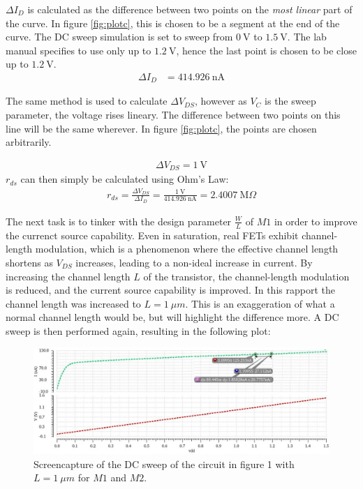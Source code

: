 \documentclass[onecolumn]{article}
\begin{document}
$\Delta I_D$ is calculated as the difference between two points on the \textit{most linear} part of the curve. In figure \ref{fig:plotc}, this is chosen to be a segment at the end of the curve. The DC sweep simulation is set to sweep from $0 \ \text{V}$ to $1.5 \ \text{V}$. The lab manual specifies to use only up to $1.2 \ \text{V}$, hence the last point is chosen to be close up to $1.2 \ \text{V}$.
\begin{align}
    \Delta I_D &= 414.926 \ \text{nA}
\end{align}

The same method is used to calculate $\Delta V_{DS}$, however as $V_C$ is the sweep parameter, the voltage rises lineary. The difference between two points on this line will be the same wherever. In figure \ref{fig:plotc}, the points are chosen arbitrarily.

\begin{align}
    \Delta V_{DS} = 1 \ \text{V}
\end{align}
$r_{ds}$ can then simply be calculated using Ohm's Law:
\begin{align}
    r_{ds} = \frac{\Delta V_{DS}}{\Delta  I_D} = \frac{ 1 \ \text{V}}{414.926 \ \text{nA}} = 2.4007 \ \text{M}\Omega
\end{align}

The next task is to tinker with the design parameter $\frac{W}{L}$ of $M1$ in order to improve the currenct source capability. Even in saturation, real FETs exhibit channel-length modulation, which is a phenomenon where the effective channel length shortens as $V_{DS}$ increases, leading to a non-ideal increase in current. By increasing the channel length $L$ of the transistor, the channel-length modulation is reduced, and the current source capability is improved.
In this rapport the channel length was increased to $L = 1 \ \mu m$. This is an exaggeration of what a normal channel length would be, but will highlight the difference more. A DC sweep is then performed again, resulting in the following plot: 

\begin{figure}[h!]
    \centering
    \includegraphics[width=1\textwidth]{plot_circuit_d_FINAL.png}
    \caption{Screencapture of the DC sweep of the circuit in figure 1 with $L = 1 \ \mu m$ for $M1$ and $M2$.}
    \label{fig:plotcnew}
\end{figure}
\end{document}
